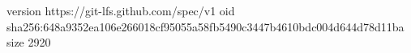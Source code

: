 version https://git-lfs.github.com/spec/v1
oid sha256:648a9352ea106e266018cf95055a58fb5490c3447b4610bdc004d644d78d11ba
size 2920
